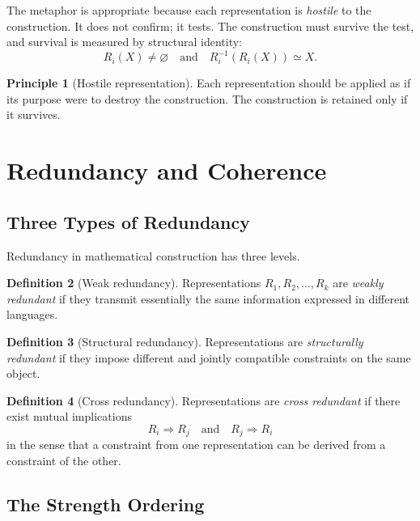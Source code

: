 \documentclass[11pt,a4paper]{article}
\theoremstyle{definition}
\newtheorem{definition}{Definition}[section]
\newtheorem{principle}[definition]{Principle}
\theoremstyle{plain}
\begin{document}
The metaphor is appropriate because each representation is
\emph{hostile} to the construction. It does not confirm; it tests.
The construction must survive the test, and survival is measured
by structural identity:
\[
  R_i(X) \neq \varnothing
  \quad\text{and}\quad
  R_i^{-1}(R_i(X)) \simeq X.
\]

\begin{principle}[Hostile representation]\label{pr:hostile}
Each representation should be applied as if its purpose were to
destroy the construction. The construction is retained only if it
survives.
\end{principle}

\section{Redundancy and Coherence}
\label{sec:redundancy}

\subsection{Three Types of Redundancy}

Redundancy in mathematical construction has three levels.

\begin{definition}[Weak redundancy]\label{def:weak-red}
Representations $R_1, R_2, \ldots, R_k$ are \emph{weakly
redundant} if they transmit essentially the same information
expressed in different languages.
\end{definition}

\begin{definition}[Structural redundancy]\label{def:strong-red}
Representations are \emph{structurally redundant} if they impose
different and jointly compatible constraints on the same object.
\end{definition}

\begin{definition}[Cross redundancy]\label{def:cross-red}
Representations are \emph{cross redundant} if there exist mutual
implications
\[
  R_i \Rightarrow R_j
  \quad\text{and}\quad
  R_j \Rightarrow R_i
\]
in the sense that a constraint from one representation can be
derived from a constraint of the other.
\end{definition}

\subsection{The Strength Ordering}
\end{document}
